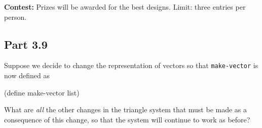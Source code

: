 {\bf Contest:} Prizes will be awarded for the best designs.
Limit: three entries
per person. 

\subsection{Part 3.9}

Suppose we decide to change the representation of vectors so that
{\tt make-vector} is now defined as

\beginlisp
(define make-vector list)
\endlisp

What are {\it all} the other changes in the triangle system that
must be made as a consequence of this change, so that the system
will continue to work as before?




